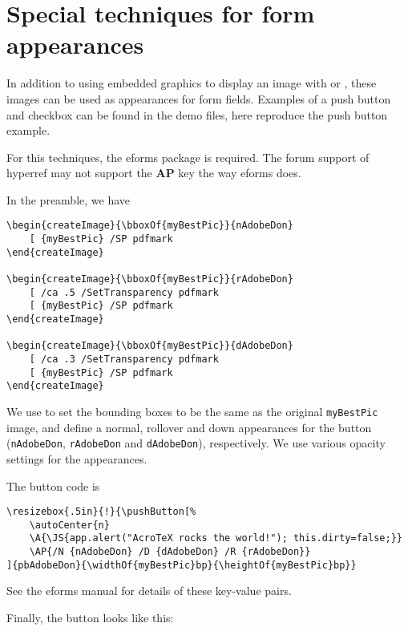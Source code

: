 \documentclass{article}
\begin{document}
\section{Special techniques for form appearances}\label{forms}

In addition to using embedded graphics to display an image with
 or , these images can be
used as appearances for form fields. Examples of a push button and
checkbox can be found in the demo files, here reproduce the push
button example.

For this techniques, the eforms package is required. The forum
support of hyperref may not support the \textbf{AP} key the way
eforms does.

In the preamble, we have
\begin{Verbatim}
\begin{createImage}{\bboxOf{myBestPic}}{nAdobeDon}
    [ {myBestPic} /SP pdfmark
\end{createImage}

\begin{createImage}{\bboxOf{myBestPic}}{rAdobeDon}
    [ /ca .5 /SetTransparency pdfmark
    [ {myBestPic} /SP pdfmark
\end{createImage}

\begin{createImage}{\bboxOf{myBestPic}}{dAdobeDon}
    [ /ca .3 /SetTransparency pdfmark
    [ {myBestPic} /SP pdfmark
\end{createImage}
\end{Verbatim}

We use  to set the bounding boxes to be the same as the
original \texttt{myBestPic} image, and define a normal, rollover and
down appearances for the button (\texttt{nAdobeDon},
\texttt{rAdobeDon} and \texttt{dAdobeDon}), respectively. We use
various opacity settings for the appearances.

The button code is

\begin{Verbatim}
\resizebox{.5in}{!}{\pushButton[%
    \autoCenter{n}
    \A{\JS{app.alert("AcroTeX rocks the world!"); this.dirty=false;}}
    \AP{/N {nAdobeDon} /D {dAdobeDon} /R {rAdobeDon}}
]{pbAdobeDon}{\widthOf{myBestPic}bp}{\heightOf{myBestPic}bp}}
\end{Verbatim}

See the eforms manual for details of these key-value pairs.

Finally, the button looks like this: 
\end{document}
